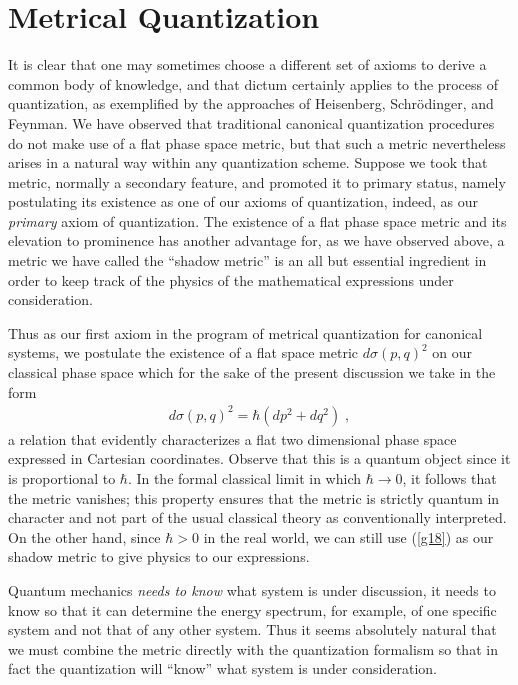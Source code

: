 \documentclass[12pt]{article}
\def\ra{\rightarrow}
\def\bn{\begin{eqnarray}}     %
\def\en{\end{eqnarray}}       %
\begin{document}
\section{Metrical Quantization}
It is clear that one may sometimes choose a different set of axioms to 
derive a common body of knowledge, and that dictum certainly applies to 
the process of quantization, as exemplified by the approaches of 
Heisenberg, Schr\"odinger, and Feynman. We have observed that 
traditional canonical quantization procedures do not make use of a flat 
phase space metric, but that such a metric nevertheless arises in a 
natural way within any quantization scheme. Suppose we took that metric, 
normally a secondary feature, and promoted it to primary status, namely 
postulating its existence as one of our axioms of quantization, indeed, 
as our {\it primary} axiom of quantization. The existence of a flat phase 
space metric and its elevation to prominence has another advantage for, 
as we have observed above, a metric we have called the ``shadow metric'' 
is an all but essential ingredient in order to keep track of the physics 
of the mathematical expressions under consideration. 

Thus as our first axiom in the program of metrical quantization for 
canonical systems, we postulate the existence of a flat space metric 
$d\sigma(p,q)^2$ on our classical phase space which for the sake of the 
present discussion we take in the form
  \bn  d\sigma(p,q)^2=\hbar(dp^2+dq^2)\;,  \label{g18}\en
a relation that evidently characterizes a flat two dimensional phase 
space expressed in Cartesian coordinates.
Observe that this is a quantum object since it is proportional to $\hbar$. 
In the formal classical limit in which $\hbar\ra0$, it follows that the 
metric vanishes; this property ensures that the metric is strictly quantum 
in character and not part of the usual classical theory as conventionally 
interpreted. On the other hand, since $\hbar>0$ in the real world, 
we can still use (\ref{g18}) as our shadow metric to give physics to our 
expressions. 

Quantum mechanics {\it needs to know} what system is under discussion, it 
needs to know so that it can determine the energy spectrum, for example, 
of one specific system and not that of any other system. Thus it seems 
absolutely natural that we must combine the metric directly with the 
quantization formalism so that in fact the quantization will ``know'' 
what system is under consideration. 
\end{document}
